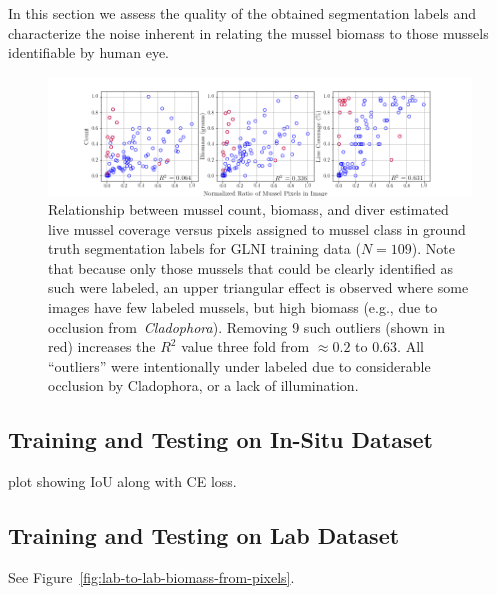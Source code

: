 \documentclass[11pt]{article} %
\begin{document}
In this section we assess the quality of the obtained segmentation labels and
characterize the noise inherent in relating the mussel biomass to those mussels
identifiable by human eye.

\begin{figure}
\centering
\includegraphics[width=0.9\linewidth]{img/Train-all-109-annotate-outliers}
\caption{Relationship between mussel count, biomass, and diver estimated live
mussel coverage versus pixels assigned to mussel class in ground truth
segmentation labels for GLNI training data ($N=109$). Note that because only 
those mussels that could be clearly identified as such were labeled, an upper 
triangular effect is observed where some images have few labeled mussels, 
but high biomass (e.g., due to occlusion from~\emph{Cladophora}). Removing 9 
such outliers (shown in red) increases the $R^2$ value three fold from $\approx
0.2$ to $0.63$. All ``outliers'' were intentionally under labeled due to
considerable occlusion by Cladophora, or a lack of illumination.}
\label{fig:train-biomass-from-labels}
\end{figure}


\subsection{Training and Testing on In-Situ Dataset}

plot showing IoU along with CE loss.


\subsection{Training and Testing on Lab Dataset}

See Figure~\ref{fig:lab-to-lab-biomass-from-pixels}.

\newcommand{\labtolab}{./img/lab_to_lab/}
\end{document}
